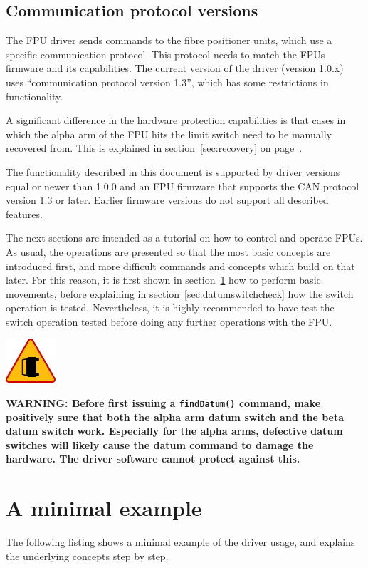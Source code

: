 \documentclass[11pt,a4paper]{scrartcl}
\newenvironment{warning}{\begin{framed}\includegraphics[width=5em]{accident-area-ahead.png}
}{\end{framed}}
\begin{document}
\subsection{Communication protocol versions}
 
 The FPU driver
sends commands to the fibre positioner units, which use a specific
communication protocol. This protocol needs to match the FPUs firmware
and its capabilities. The current version of the driver (version
1.0.x) uses ``communication protocol version 1.3'', which has some
restrictions in functionality.

A significant difference in the hardware protection capabilities is
that cases in which the alpha arm of the FPU hits the limit switch
need to be manually recovered from. This is explained in
section~\ref{sec:recovery} on page~\pageref{sec:recovery}.


The functionality described in this document is supported by driver
versions equal or newer than 1.0.0 and an FPU  firmware that supports the
CAN protocol version 1.3 or later. Earlier firmware versions do not
support all described features.

The next sections are intended as a tutorial on how to control and
operate FPUs. As usual, the operations are presented so that the most
basic concepts are introduced first, and more difficult commands and
concepts which build on that later. For this reason, it is first shown
in section~\ref{sec:minimalexample} how to perform basic movements,
before explaining in section~\ref{sec:datumswitchcheck} how the switch
operation is tested. Nevertheless, it is highly recommended to have
test the switch operation tested before doing any further operations
with the FPU.

\begin{warning}
  \textbf{WARNING: Before first issuing a \texttt{findDatum()}
    command, make positively sure that both the alpha arm datum switch
    and the beta datum switch work. Especially for the alpha arms,
    defective datum switches will likely cause the datum command to
    damage the hardware. The driver software cannot protect against
    this.}
\end{warning}


\section{A minimal example}
\label{sec:minimalexample}
The following listing shows a minimal example of the
driver usage, and explains the underlying concepts
step by step.
\end{document}
